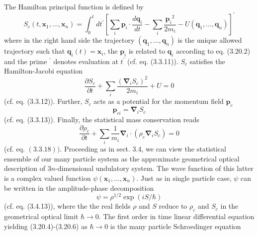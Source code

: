 \documentclass{article}
\begin{document}
The Hamilton principal function is defined by
$$
\begin{equation*}
S_{c}\left(t, \boldsymbol{x}_{1}, \ldots, \boldsymbol{x}_{n}\right)=\int_{0}^{t} d t^{\prime}\left[\sum_{i} \boldsymbol{p}_{i} \cdot \frac{d \boldsymbol{q}_{i}}{d t}-\sum_{i} \frac{\boldsymbol{p}_{i}{ }^{2}}{2 m_{i}}-U\left(\boldsymbol{q}_{1}, \ldots, \boldsymbol{q}_{n}\right)\right]^{\prime} \tag{3.20.3}
\end{equation*}
$$
where in the right hand side the trajectory $\left(\boldsymbol{q}_{1}, \ldots, \boldsymbol{q}_{n}\right)$ is the unique allowed trajectory such that $\boldsymbol{q}_{i}(t)=\boldsymbol{x}_{i}$, the $\boldsymbol{p}_{i}$ is related to $\boldsymbol{q}_{i}$ according to eq. (3.20.2) and the prime ${ }^{\prime}$ denotes evaluation at $t^{\prime}$ (cf. eq. (3.3.11)). $S_{c}$ satisfies the Hamilton-Jacobi equation
$$
\begin{equation*}
\frac{\partial S_{c}}{\partial t}+\sum_{i} \frac{\left(\boldsymbol{\nabla}_{i} S_{c}\right)^{2}}{2 m_{i}}+U=0 \tag{3.20.4}
\end{equation*}
$$
(cf. eq. (3.3.12)). Further, $S_{c}$ acts as a potential for the momentum field $\boldsymbol{p}_{c}$
$$
\begin{equation*}
\boldsymbol{p}_{c i}=\boldsymbol{\nabla}_{i} S_{c} \tag{3.20.5}
\end{equation*}
$$
(cf. eq. (3.3.13)). Finally, the statistical mass conservation reads
$$
\begin{equation*}
\frac{\partial \rho_{c}}{\partial t}+\sum_{i} \frac{1}{m_{i}} \boldsymbol{\nabla}_{i} \cdot\left(\rho_{c} \boldsymbol{\nabla}_{i} S_{c}\right)=0 \tag{3.20.6}
\end{equation*}
$$
(cf. eq. $(3.3 .18))$.
Proceeding as in sect. 3.4, we can view the statistical ensemble of our many particle system as the approximate geometrical optical description of $3 n$-dimensional undulatory system. The wave function of this latter is a complex valued function $\psi\left(\boldsymbol{x}_{1}, \ldots, \boldsymbol{x}_{n}\right)$. Just as in single particle case, $\psi$ can be written in the amplitude-phase decomposition
$$
\begin{equation*}
\psi=\rho^{1 / 2} \exp (i S / \hbar) \tag{3.20.7}
\end{equation*}
$$
(cf. eq. (3.4.13)), where the the real fields $\rho$ and $S$ reduce to $\rho_{c}$ and $S_{c}$ in the geometrical optical limit $\hbar \rightarrow 0$. The first order in time linear differential equation yielding (3.20.4)-(3.20.6) as $\hbar \rightarrow 0$ is the many particle Schroedinger equation
\end{document}
